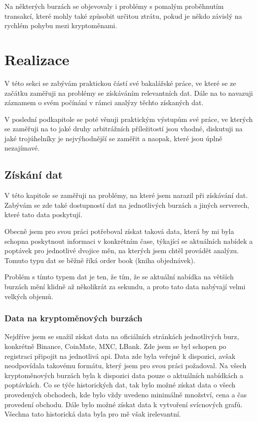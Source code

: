 \documentclass[thesis=B,czech]{FITthesis}[2019/03/21]
\begin{document}
Na některých burzách se objevovaly i problémy s pomalým proběhnutím transakcí, které mohly také způsobit určitou ztrátu, pokud je někdo závislý na rychlém pohybu mezi kryptoměnami. \cite{finder}

\chapter{Realizace}
V této sekci se zabývám praktickou částí své bakalářské práce, ve které se ze začátku zaměřuji na problémy se získáváním relevantních dat. Dále na to navazuji záznamem o svém počínání v rámci analýzy těchto získaných dat. 

V poslední podkapitole se poté věnuji praktickým výstupům své práce, ve kterých se zaměřuji na to jaké druhy arbitrážních příležitostí jsou vhodné, diskutuji na jaké trojúhelníky je nejvýhodnější se zaměřit a naopak, které jsou úplně nezajímavé.

\section{Získání dat}
V této kapitole se zaměřuji na problémy, na které jsem narazil při získávání dat. Zabývám se zde také dostupností dat na jednotlivých burzách a jiných serverech, které tato data poskytují. 

Obecně jsem pro svou práci potřeboval získat taková data, která by mi byla schopna poskytnout informaci v konkrétním čase, týkající se aktuálních nabídek a poptávek pro jednotlivé dvojice měn, na kterých jsem chtěl provádět analýzu. Tomuto typu dat se běžně říká order book (kniha objednávek).

Problém s tímto typem dat je ten, že tím, že se aktuální nabídka na větších burzách mění klidně až několikrát za sekundu, a proto tato data nabývají velmi velkých objemů.

\subsection{Data na kryptoměnových burzách}
Nejdříve jsem se snažil získat data na oficiálních stránkách jednotlivých burz, konkrétně Binance, CoinMate, MXC, LBank. Zde jsem se byl schopen po registraci připojit na jednotlivá api. Data zde byla veřejně k dispozici, avšak neodpovídala takovému formátu, který jsem pro svou práci požadoval. 
Na všech kryptoměnových burzách byla k dispozici data pouze o aktuálních nabídkách a poptávkách. Co se týče historických dat, tak bylo možné získat data o všech provedených obchodech, kde bylo vždy uvedeno minimálně množství, cena a čas provedení obchodu. Dále bylo možné získat data k vytvoření svícnových grafů. Všechna tato historická data byla pro mě však irelevantní.
\end{document}
